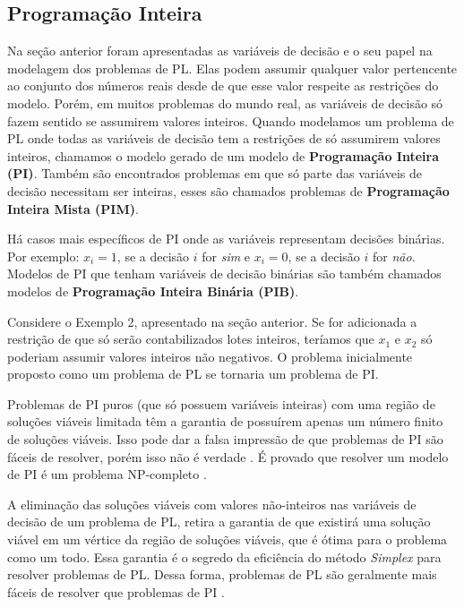 \subsection{Programação Inteira}	

Na seção anterior foram apresentadas as variáveis de decisão e o seu papel na modelagem dos problemas de PL. Elas podem assumir qualquer valor pertencente ao conjunto dos números reais desde de que esse valor respeite as restrições do modelo. Porém, em muitos problemas do mundo real, as variáveis de decisão só fazem sentido se assumirem valores inteiros. Quando modelamos um problema de PL onde todas as variáveis de decisão tem a restrições de só assumirem valores inteiros, chamamos o modelo gerado de um modelo de \textbf{Programação Inteira (PI)}. Também são encontrados problemas em que só parte das variáveis de decisão necessitam ser inteiras, esses são chamados problemas de \textbf{Programação Inteira Mista (PIM)}. 

Há casos mais específicos de PI onde as variáveis representam decisões binárias. Por exemplo: $x_i = 1$, se a decisão $i$ for \textit{sim} e $x_i = 0$, se a decisão $i$ for \textit{não}. Modelos de PI que tenham variáveis de decisão binárias são também chamados modelos de \textbf{Programação Inteira Binária (PIB)}.

Considere o Exemplo 2, apresentado na seção anterior. Se for adicionada a restrição de que só serão contabilizados lotes inteiros, teríamos que $x_1$ e $x_2$ só poderiam assumir valores inteiros não negativos. O problema inicialmente proposto como um problema de PL se tornaria um problema de PI.

Problemas de PI puros (que só possuem variáveis inteiras) com uma região de soluções viáveis limitada têm a garantia de possuírem apenas um número finito de soluções viáveis. Isso pode dar a falsa impressão de que problemas de PI são fáceis de resolver, porém isso não é verdade \cite{hillier2010introduccao}. É provado que resolver um modelo de PI é um problema NP-completo \cite{schrijver1998theory}.

A eliminação das soluções viáveis com valores não-inteiros nas variáveis de decisão de um problema de PL, retira a garantia de que existirá uma solução viável em um vértice da região de soluções viáveis, que é ótima para o problema como um todo. Essa garantia é o segredo da eficiência do método \textit{Simplex} \cite{schrijver1998theory} para resolver problemas de PL. Dessa forma, problemas de PL são geralmente mais fáceis de resolver que problemas de PI \cite{hillier2010introduccao}.

